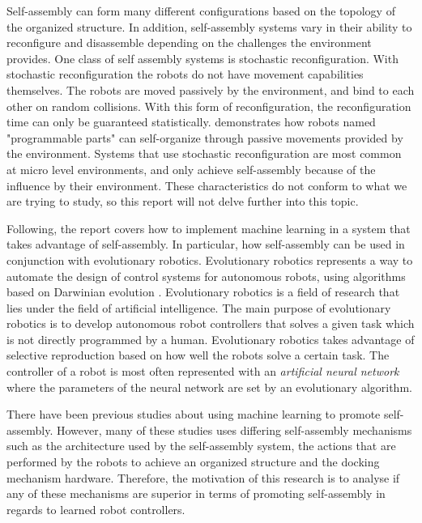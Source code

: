 Self-assembly can form many different configurations based on the topology of the organized structure.
In addition, self-assembly systems vary in their ability to reconfigure and disassemble depending on the challenges the environment provides.
One class of self assembly systems is stochastic reconfiguration. 
With stochastic reconfiguration the robots do not have movement capabilities themselves. 
The robots are moved passively by the environment, and bind to each other on random collisions\cite{gro_autonomous_2006}. 
With this form of reconfiguration, the reconfiguration time can only be guaranteed statistically\cite{yim_modular_2007}.
\cite{bishop_programmable_2005} demonstrates how robots named "programmable parts" can self-organize through passive movements provided by the environment. Systems that use stochastic reconfiguration are most common at micro level environments, and only achieve self-assembly because of the influence by their environment.
These characteristics do not conform to what we are trying to study, so this report will not delve further into this topic.

Following, the report covers how to implement machine learning in a system that takes advantage of self-assembly.
In particular, how self-assembly can be used in conjunction with evolutionary robotics.
Evolutionary robotics represents a way to automate the design of control systems for autonomous robots, using algorithms based on Darwinian evolution \cite{trianni_evolving_2004}.
Evolutionary robotics is a field of research that lies under the field of artificial intelligence. 
The main purpose of evolutionary robotics is to develop autonomous robot controllers that solves a given task which is not directly programmed by a human.
Evolutionary robotics takes advantage of selective reproduction based on how well the robots solve a certain task.
The controller of a robot is most often represented with an \emph{artificial neural network} where the parameters of the neural network are set by an evolutionary algorithm.

There have been previous studies about using machine learning to promote self-assembly\cite{trianni_evolving_2004}\cite{montanier_adaptive_2014}\cite{li_co-evolution_2015}. 
However, many of these studies uses differing self-assembly mechanisms such as the architecture used by the self-assembly system, the actions that are performed by the robots to achieve an organized structure and the docking mechanism hardware.
Therefore, the motivation of this research is to analyse if any of these mechanisms are superior in terms of promoting self-assembly in regards to learned robot controllers.

